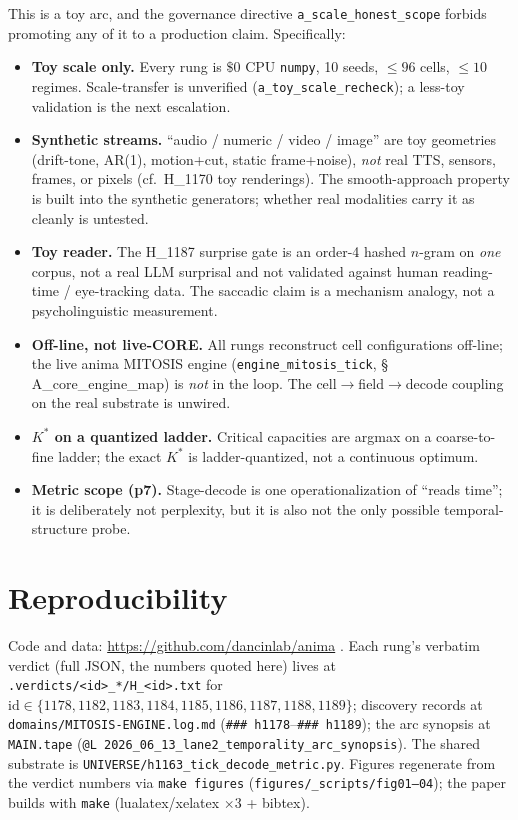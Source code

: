 \documentclass[11pt,a4paper]{article}
\newcommand{\Kstar}{K^{\!*}}
\begin{document}
This is a toy arc, and the governance directive \texttt{a\_scale\_honest\_scope}
forbids promoting any of it to a production claim. Specifically:

\begin{itemize}\itemsep0.25em
\item \textbf{Toy scale only.} Every rung is $\$0$ CPU \texttt{numpy}, 10 seeds,
  $\leq 96$ cells, $\leq 10$ regimes. Scale-transfer is unverified
  (\texttt{a\_toy\_scale\_recheck}); a less-toy validation is the next escalation.
\item \textbf{Synthetic streams.} ``audio / numeric / video / image'' are toy
  geometries (drift-tone, AR(1), motion+cut, static frame+noise), \emph{not} real
  TTS, sensors, frames, or pixels (cf.\ H\_1170 toy renderings). The
  smooth-approach property is built into the synthetic generators; whether real
  modalities carry it as cleanly is untested.
\item \textbf{Toy reader.} The H\_1187 surprise gate is an order-4 hashed
  $n$-gram on \emph{one} corpus, not a real LLM surprisal and not validated against
  human reading-time / eye-tracking data. The saccadic claim is a mechanism
  analogy, not a psycholinguistic measurement.
\item \textbf{Off-line, not live-CORE.} All rungs reconstruct cell configurations
  off-line; the live anima MITOSIS engine
  (\texttt{engine\_mitosis\_tick}, \S\,A\_core\_engine\_map) is \emph{not} in the
  loop. The cell$\to$field$\to$decode coupling on the real substrate is unwired.
\item \textbf{$\Kstar$ on a quantized ladder.} Critical capacities are argmax on a
  coarse-to-fine ladder; the exact $\Kstar$ is ladder-quantized, not a continuous
  optimum.
\item \textbf{Metric scope (p7).} Stage-decode is one operationalization of
  ``reads time''; it is deliberately not perplexity, but it is also not the only
  possible temporal-structure probe.
\end{itemize}

\section{Reproducibility}
\label{sec:repro}

Code and data: \url{https://github.com/dancinlab/anima} \citep{anima_repo}. Each rung's verbatim
verdict (full JSON, the numbers quoted here) lives at
\texttt{.verdicts/<id>\_*/H\_<id>.txt} for
$\text{id}\in\{1178,1182,1183,1184,1185,1186,1187,1188,1189\}$; discovery records
at \texttt{domains/MITOSIS-ENGINE.log.md} (\verb|### h1178|--\verb|### h1189|); the
arc synopsis at \texttt{MAIN.tape}
(\verb|@L 2026_06_13_lane2_temporality_arc_synopsis|). The shared substrate is
\texttt{UNIVERSE/h1163\_tick\_decode\_metric.py}. Figures regenerate from the
verdict numbers via \texttt{make figures} (\texttt{figures/\_scripts/fig01--04});
the paper builds with \texttt{make} (lualatex/xelatex $\times 3$ + bibtex).
\end{document}
